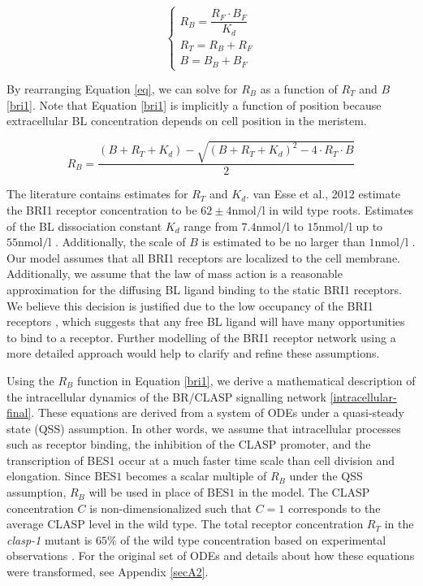 \documentclass[referee,pdflatex,sn-mathphys-num]{sn-jnl}
\newcommand{\nm}{\unit{\nano\mole\per\litre}}
\begin{document}
\begin{equation}
\begin{cases}
    \label{eq}
    R_{B} = \dfrac{R_{F} \cdot B_{F}}{K_{d}} \\
    R_{T} = R_{B} + R_{F} \\
    B = B_{B} + B_{F} 
\end{cases}
\end{equation}

By rearranging Equation \eqref{eq}, we can solve for $R_{B}$ as a function of $R_{T}$ and $B$ \eqref{bri1}.
Note that Equation \eqref{bri1} is implicitly a function of position because extracellular BL concentration depends on cell position in the meristem.

\begin{equation}
\label{bri1}
R_{B} = \frac{(B + R_{T} + K_{d}) - \sqrt{(B + R_{T} + K_{d})^{2} - 4 \cdot  R_{T} \cdot B}}{2}
\end{equation}

The literature contains estimates for $R_{T}$ and $K_{d}$.
van Esse et al., 2012 \cite{vanesse2012} estimate the BRI1 receptor concentration to be $62 \pm 4 \nm$ in wild type roots.
Estimates of the BL dissociation constant $K_{d}$ range from $7.4 \nm$ to $15 \nm$ \cite{wang2001} up to $55 \nm$ \cite{cano-delgado2004}.
Additionally, the scale of $B$ is estimated to be no larger than $1\nm$ \cite{vanesse2012}.
Our model assumes that all BRI1 receptors are localized to the cell membrane.
Additionally, we assume that the law of mass action is a reasonable approximation for the diffusing BL ligand binding to the static BRI1 receptors.
We believe this decision is justified due to the low occupancy of the BRI1 receptors \cite{vanesse2012}, which suggests that any free BL ligand will have many opportunities to bind to a receptor.
Further modelling of the BRI1 receptor network using a more detailed approach would help to clarify and refine these assumptions.

Using the $R_{B}$ function in Equation \eqref{bri1}, we derive a mathematical description of the intracellular dynamics of the BR/CLASP signalling network \eqref{intracellular-final}.
These equations are derived from a system of ODEs under a quasi-steady state (QSS) assumption.
In other words, we assume that intracellular processes such as receptor binding, the inhibition of the CLASP promoter, and the transcription of BES1 occur at a much faster time scale than cell division and elongation.
Since $\text{BES1}$ becomes a scalar multiple of $R_{B}$ under the QSS assumption, $R_{B}$ will be used in place of $\text{BES1}$ in the model.
The CLASP concentration $C$ is non-dimensionalized such that $C = 1$ corresponds to the average CLASP level in the wild type.
The total receptor concentration $R_{T}$ in the \emph{clasp-1} mutant is $65\%$ of the wild type concentration based on experimental observations \cite{ruan2018}.
For the original set of ODEs and details about how these equations were transformed, see Appendix \ref{secA2}.
\end{document}
